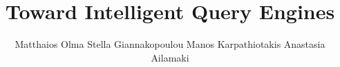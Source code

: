 \documentclass[11pt]{article}
\begin{document}
	\title{Toward Intelligent Query Engines}

\author{Matthaios Olma \hspace{1em}  Stella Giannakopoulou 
\hspace{1em} Manos Karpathiotakis \hspace{1em}  Anastasia Ailamaki}


	\maketitle
	
	
	
	
	
	
		
	
		
%
%
	\begin{thebibliography}{10}
	\itemsep=1pt
	\begin{small}
			
	
	\end{small}
	\end{thebibliography} 	
	
\end{document}
